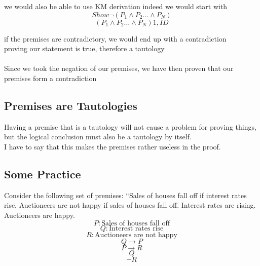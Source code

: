 \documentclass[a4paper,12pt]{article}
\begin{document}
\bigskip

we would also be able to use KM derivation
indeed we would start with
  \[ Show \lnot ( P_{1} \wedge P_{2} \dots \wedge P_{N}) \]
  \[( P_{1} \wedge P_{2} \dots \wedge P_{N}) 1,ID\] 
  
if the premises are contradictory, we would end up with a contradiction\\
proving our statement is true, therefore a tautology\\
\bigskip\\
Since we took the negation of our premises, we have then proven that our premises form a contradiction\\

\subsection{Premises are Tautologies}
Having a premise that is a tautology will not cause a problem for proving things, but the logical conclusion must also be a tautology by itself.\\
I have to say that this makes the premises rather useless in the proof.\\
\subsection{Some Practice}
Consider the following set of premises: ``Sales of houses fall off if interest rates rise. Auctioneers are not happy if sales of houses fall off. Interest rates are rising. Auctioneers are happy.
\[
P: \text{Sales of houses fall off} 
\]
\[
Q: \text{Interest rates rise}
\]
\[
R: \text{Auctioneers are not happy}
\]
\begin{equation} 
Q\rightarrow P 
\end{equation}
\begin{equation} 
P \rightarrow R
\end{equation}
\begin{equation} 
Q
\end{equation}
\begin{equation} 
\lnot R
\end{equation}
\end{document}
